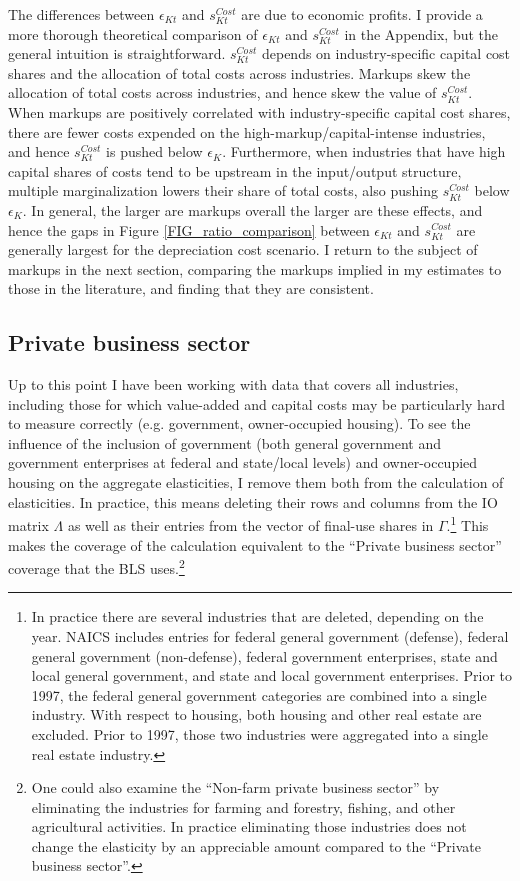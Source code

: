 \documentclass[11pt]{article}
\begin{document}
The differences between $\epsilon_{Kt}$ and $s^{Cost}_{Kt}$ are due to economic profits. I provide a more thorough theoretical comparison of $\epsilon_{Kt}$ and $s^{Cost}_{Kt}$ in the Appendix, but the general intuition is straightforward. $s^{Cost}_{Kt}$ depends on industry-specific capital cost shares and the allocation of total costs across industries. Markups skew the allocation of total costs across industries, and hence skew the value of $s^{Cost}_{Kt}$. When markups are positively correlated with industry-specific capital cost shares, there are fewer costs expended on the high-markup/capital-intense industries, and hence $s^{Cost}_{Kt}$ is pushed below $\epsilon_K$. Furthermore, when industries that have high capital shares of costs tend to be upstream in the input/output structure, multiple marginalization lowers their share of total costs, also pushing $s^{Cost}_{Kt}$ below $\epsilon_K$. In general, the larger are markups overall the larger are these effects, and hence the gaps in Figure \ref{FIG_ratio_comparison} between $\epsilon_{Kt}$ and $s^{Cost}_{Kt}$ are generally largest for the depreciation cost scenario. I return to the subject of markups in the next section, comparing the markups implied in my estimates to those in the literature, and finding that they are consistent.

\subsection{Private business sector}
Up to this point I have been working with data that covers all industries, including those for which value-added and capital costs may be particularly hard to measure correctly (e.g. government, owner-occupied housing). To see the influence of the inclusion of government (both general government and government enterprises at federal and state/local levels) and owner-occupied housing on the aggregate elasticities, I remove them both from the calculation of elasticities. In practice, this means deleting their rows and columns from the IO matrix $\Lambda$ as well as their entries from the vector of final-use shares in $\Gamma$.\footnote{In practice there are several industries that are deleted, depending on the year. NAICS includes entries for federal general government (defense), federal general government (non-defense), federal government enterprises, state and local general government, and state and local government enterprises. Prior to 1997, the federal general government categories are combined into a single industry. With respect to housing, both housing and other real estate are excluded. Prior to 1997, those two industries were aggregated into a single real estate industry.} This makes the coverage of the calculation equivalent to the ``Private business sector'' coverage that the BLS uses.\footnote{One could also examine the ``Non-farm private business sector'' by eliminating the industries for farming and forestry, fishing, and other agricultural activities. In practice eliminating those industries does not change the elasticity by an appreciable amount compared to the ``Private business sector''.} 
\end{document}
